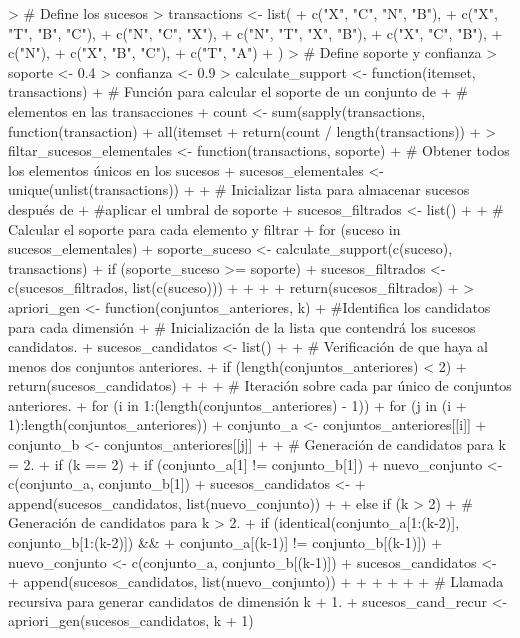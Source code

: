 \documentclass[a4paper, 12pt]{article}
\begin{document}
\begin{Schunk}
\begin{Sinput}
> # Define los sucesos
> transactions <- list(
+ 	c("X", "C", "N", "B"),
+ 	c("X", "T", "B", "C"),
+ 	c("N", "C", "X"),
+ 	c("N", "T", "X", "B"),
+ 	c("X", "C", "B"),
+ 	c("N"),
+ 	c("X", "B", "C"),
+ 	c("T", "A")
+ )
> # Define soporte y confianza
> soporte <- 0.4
> confianza <- 0.9
> calculate_support <- function(itemset, transactions) {
+ 	# Función para calcular el soporte de un conjunto de 
+ 	# elementos en las transacciones
+ 	count <- sum(sapply(transactions, function(transaction) 
+ 	all(itemset %
+ 	return(count / length(transactions))
+ }
> filtar_sucesos_elementales <- function(transactions, soporte) {
+ 	# Obtener todos los elementos únicos en los sucesos
+ 	sucesos_elementales <- unique(unlist(transactions))
+ 
+ 	# Inicializar lista para almacenar sucesos después de 
+ 	#aplicar el umbral de soporte
+ 	sucesos_filtrados <- list()
+ 
+ 	# Calcular el soporte para cada elemento y filtrar
+ 	for (suceso in sucesos_elementales) {
+ 	soporte_suceso <- calculate_support(c(suceso), transactions)
+ 	if (soporte_suceso >= soporte) {
+ 		sucesos_filtrados <- c(sucesos_filtrados, list(c(suceso)))
+ 	}
+ 	}
+ 
+ 	return(sucesos_filtrados)
+ }
> apriori_gen <- function(conjuntos_anteriores, k) {
+ 	#Identifica los candidatos para cada dimensión
+ 	# Inicialización de la lista que contendrá los sucesos candidatos.
+ 	sucesos_candidatos <- list()
+ 
+   # Verificación de que haya al menos dos conjuntos anteriores.
+   if (length(conjuntos_anteriores) < 2) {
+     return(sucesos_candidatos)
+   }
+   
+   # Iteración sobre cada par único de conjuntos anteriores.
+   for (i in 1:(length(conjuntos_anteriores) - 1)) {
+     for (j in (i + 1):length(conjuntos_anteriores)) {
+ 	  conjunto_a <- conjuntos_anteriores[[i]]
+ 	  conjunto_b <- conjuntos_anteriores[[j]]
+ 
+ 	  # Generación de candidatos para k = 2.
+ 	  if (k == 2) {
+ 	    if (conjunto_a[1] != conjunto_b[1]) {
+ 		  nuevo_conjunto <- c(conjunto_a, conjunto_b[1])
+ 		  sucesos_candidatos <- 
+ 		  append(sucesos_candidatos, list(nuevo_conjunto))
+ 	    }
+ 	  } else if (k > 2) {
+ 	    # Generación de candidatos para k > 2.
+ 	    if (identical(conjunto_a[1:(k-2)], conjunto_b[1:(k-2)]) && 
+ 		conjunto_a[(k-1)] != conjunto_b[(k-1)]) {
+ 		  nuevo_conjunto <- c(conjunto_a, conjunto_b[(k-1)])
+ 		  sucesos_candidatos <- 
+ 		  append(sucesos_candidatos, list(nuevo_conjunto))
+ 	    }
+ 	  }
+     }
+   }
+ 
+   # Llamada recursiva para generar candidatos de dimensión k + 1.
+   sucesos_cand_recur <- apriori_gen(sucesos_candidatos, k + 1)
}
\end{Sinput}
\end{Schunk}
\end{document}
